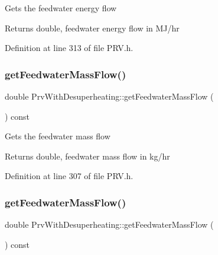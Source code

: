 Gets the feedwater energy flow \begin{DoxyReturn}{Returns}
double, feedwater energy flow in M\+J/hr 
\end{DoxyReturn}


Definition at line 313 of file P\+R\+V.\+h.

\mbox{\label{class_prv_with_desuperheating_a9bd8ee7d5b563110a7279102352b8f4d}} 
\subsubsection{\texorpdfstring{get\+Feedwater\+Mass\+Flow()}{getFeedwaterMassFlow()}\hspace{0.1cm}{\footnotesize\ttfamily [1/3]}}
{\footnotesize\ttfamily double Prv\+With\+Desuperheating\+::get\+Feedwater\+Mass\+Flow (\begin{DoxyParamCaption}{ }\end{DoxyParamCaption}) const\hspace{0.3cm}{\ttfamily [inline]}}

Gets the feedwater mass flow \begin{DoxyReturn}{Returns}
double, feedwater mass flow in kg/hr 
\end{DoxyReturn}


Definition at line 307 of file P\+R\+V.\+h.

\mbox{\label{class_prv_with_desuperheating_a9bd8ee7d5b563110a7279102352b8f4d}} 
\subsubsection{\texorpdfstring{get\+Feedwater\+Mass\+Flow()}{getFeedwaterMassFlow()}\hspace{0.1cm}{\footnotesize\ttfamily [2/3]}}
{\footnotesize\ttfamily double Prv\+With\+Desuperheating\+::get\+Feedwater\+Mass\+Flow (\begin{DoxyParamCaption}{ }\end{DoxyParamCaption}) const\hspace{0.3cm}{\ttfamily [inline]}}

